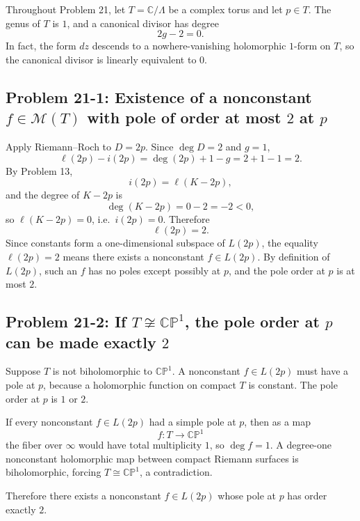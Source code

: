 \documentclass[11pt]{article}
\newcommand{\C}{\mathbb{C}}
\newcommand{\CP}{\mathbb{CP}}
\begin{document}
Throughout Problem 21, let $T=\C/\Lambda$ be a complex torus and let $p\in T$. The genus of $T$ is $1$, and a canonical divisor has degree
\[
 2g-2=0.
\]
In fact, the form $dz$ descends to a nowhere-vanishing holomorphic $1$-form on $T$, so the canonical divisor is linearly equivalent to $0$.

\subsection*{Problem 21-1: Existence of a nonconstant $f\in\mathcal M(T)$ with pole of order at most $2$ at $p$}

Apply Riemann--Roch to $D=2p$. Since $\deg D=2$ and $g=1$,
\[
 \ell(2p)-i(2p)=\deg(2p)+1-g=2+1-1=2.
\]
By Problem 13,
\[
 i(2p)=\ell(K-2p),
\]
and the degree of $K-2p$ is
\[
 \deg(K-2p)=0-2=-2<0,
\]
so $\ell(K-2p)=0$, i.e.\ $i(2p)=0$. Therefore
\[
 \ell(2p)=2.
\]
Since constants form a one-dimensional subspace of $L(2p)$, the equality $\ell(2p)=2$ means there exists a nonconstant $f\in L(2p)$. By definition of $L(2p)$, such an $f$ has no poles except possibly at $p$, and the pole order at $p$ is at most $2$.

\subsection*{Problem 21-2: If $T\not\cong\CP^1$, the pole order at $p$ can be made exactly $2$}

Suppose $T$ is not biholomorphic to $\CP^1$. A nonconstant $f\in L(2p)$ must have a pole at $p$, because a holomorphic function on compact $T$ is constant. The pole order at $p$ is $1$ or $2$.

If every nonconstant $f\in L(2p)$ had a simple pole at $p$, then as a map
\[
 f:T\to\CP^1
\]
the fiber over $\infty$ would have total multiplicity $1$, so $\deg f=1$. A degree-one nonconstant holomorphic map between compact Riemann surfaces is biholomorphic, forcing $T\cong\CP^1$, a contradiction.

Therefore there exists a nonconstant $f\in L(2p)$ whose pole at $p$ has order exactly $2$.
\end{document}
